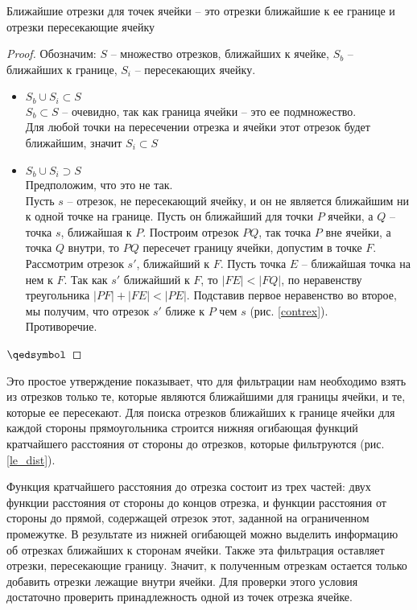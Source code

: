 {\prop\label{cl_segs}
Ближайшие отрезки для точек ячейки – это отрезки ближайшие к ее границе и отрезки пересекающие ячейку}
\begin{proof}
Обозначим: $S$ -- множество отрезков, ближайших к ячейке, $S_b$ -- ближайших к границе, $S_i$ --
пересекающих ячейку.
\begin{itemize}
\item $S_b \cup S_i \subset S$ \\
$S_b \subset S$ -- очевидно, так как граница ячейки -- это ее подмножество.\\
Для любой точки на пересечении отрезка и ячейки этот отрезок будет
ближайшим, значит $S_i \subset S$
\item $S_b \cup S_i \supset S$ \\
Предположим, что это не так.\\Пусть $s$ -- отрезок, не пересекающий
ячейку, и он не является ближайшим ни к одной точке на границе. Пусть
он ближайший для точки $P$ ячейки, а $Q$ -- точка $s$, ближайшая к $P$.
Построим отрезок $PQ$, так точка $P$ вне ячейки, а точка $Q$ внутри, то $PQ$
пересечет границу ячейки, допустим в точке $F$. Рассмотрим отрезок $s'$,
ближайший к $F$. Пусть точка $E$ -- ближайшая точка на нем к $F$.
Так как $s'$ ближайший к $F$, то $|FE| < |FQ|$, по неравенству треугольника $|PF|
+ |FE| < |PE|$. Подставив первое неравенство во второе, мы получим, что
отрезок $s'$ ближе к $P$ чем $s$ (рис. \ref{contrex}).\\
Противоречие.
\end{itemize}
$\qedsymbol$
\end{proof}

Это простое утверждение показывает, что для фильтрации нам
необходимо взять из отрезков только те, которые являются ближайшими для
границы ячейки, и те, которые ее пересекают.
Для поиска отрезков ближайших к границе ячейки для каждой стороны
прямоугольника строится нижняя огибающая функций кратчайшего расстояния от
стороны до отрезков, которые фильтруются (рис. \ref{le_dist}).

Функция кратчайшего расстояния до отрезка состоит из трех частей: двух функции расстояния от
стороны до концов отрезка, и функции расстояния от стороны до прямой,
содержащей отрезок этот, заданной на ограниченном промежутке. В результате
из нижней огибающей можно выделить информацию об отрезках ближайших к
сторонам ячейки. Также эта фильтрация оставляет отрезки, пересекающие
границу. Значит, к полученным отрезкам остается только добавить отрезки
лежащие внутри ячейки. Для проверки этого условия достаточно проверить
принадлежность одной из точек отрезка ячейке.

